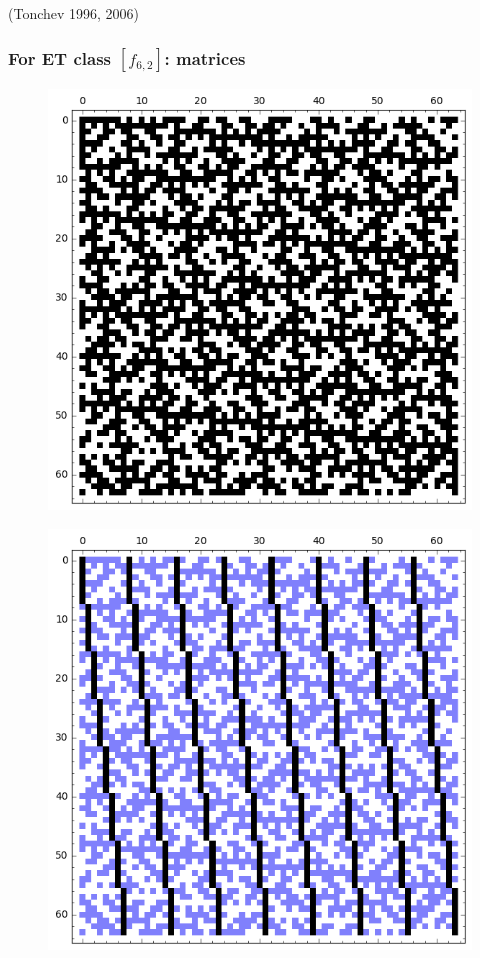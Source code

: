 \documentclass[pdf,sprung,slideColor,nocolorBG]{beamer}
\newenvironment{colortheme}[1]{
\def\ProvidesPackageRCS $##1${\relax}
\renewcommand{\ProcessOptions}{\relax}
\makeatletter

\makeatother
}{}
\newcommand{\slidecite}[1]{\tiny{(#1)}\normalsize{}}
\begin{document}
\begin{colortheme}{jubata}
\begin{frame}
\slidecite{Tonchev 1996, 2006}
\end{frame}
\begin{frame}
\frametitle{For ET class $[f_{6,2}]$: matrices}
\begin{figure}
\centering
\begin{minipage}{.48\textwidth}
  \centering
  \includegraphics[width=.9\linewidth]{../matrix_plot/c6_2_weight_class_matrix.png}
  \label{fig:6_2_weight_class_matrix}
\end{minipage}%
\begin{minipage}{.48\textwidth}
  \centering
  \includegraphics[width=.9\linewidth]{../matrix_plot/c6_2_bent_cayley_graph_index_matrix.png}

\end{minipage}
\end{figure}
\end{frame}
\end{colortheme}
\end{document}

